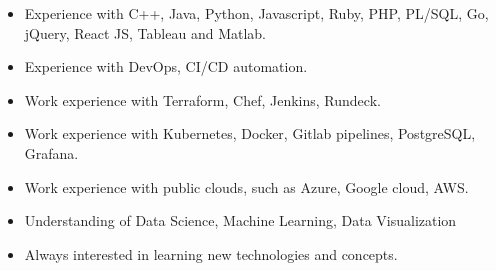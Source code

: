 \documentclass[10pt,a4paper,ragged2e,withhyper]{altacv}
\begin{document}
\begin{paracol}{2}

\begin{itemize}
\item Experience with C++, Java, Python, Javascript, Ruby, PHP, PL/SQL, Go, jQuery, React JS, Tableau and Matlab.
\item Experience with DevOps, CI/CD automation.
\item Work experience with Terraform, Chef, Jenkins, Rundeck.
\item Work experience with Kubernetes, Docker, Gitlab pipelines, PostgreSQL, Grafana.
\item Work experience with public clouds, such as Azure, Google cloud, AWS.
\item Understanding of Data Science, Machine Learning, Data Visualization
\item Always interested in learning new technologies and concepts. 
\end{itemize}

\divider




\end{paracol}
\end{document}
